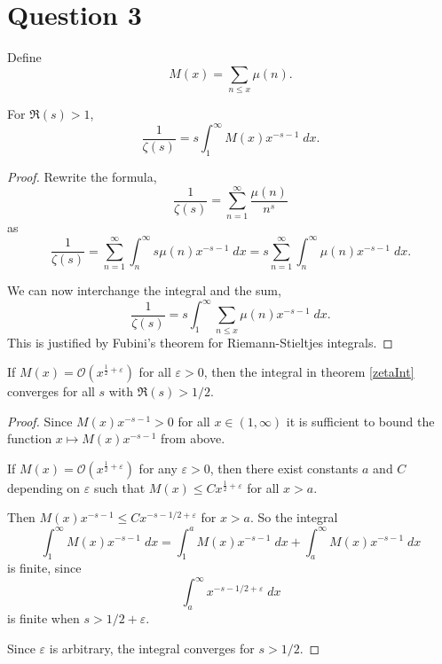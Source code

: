 \documentclass{unswmaths}
\begin{document}
\section*{Question 3}
Define
\begin{equation*}
    M(x) = \sum_{n\leq x} \mu(n).
\end{equation*}
\begin{theorem} 
\label{zetaInt}
    For $\Re(s) > 1$,
    \begin{equation*}
        \frac{1}{\zeta(s)} = s\int_{1}^\infty M(x)x^{-s-1}\;dx.
    \end{equation*}
\end{theorem}
\begin{proof}
    Rewrite the formula,
    \begin{equation*}
        \frac{1}{\zeta(s)} = \sum_{n=1}^\infty \frac{\mu(n)}{n^s}
    \end{equation*}
    as
    \begin{equation*}
        \frac{1}{\zeta(s)} = \sum_{n=1}^\infty \int_{n}^\infty s\mu(n)x^{-s-1}\;dx = s\sum_{n=1}^\infty \int_{n}^\infty \mu(n)x^{-s-1}\;dx.
    \end{equation*}
    
    We can now interchange the integral and the sum,
    \begin{equation*}
        \frac{1}{\zeta(s)} = s\int_{1}^\infty\sum_{n\leq x} \mu(n) x^{-s-1}\;dx.
    \end{equation*}
    This is justified by Fubini's theorem for Riemann-Stieltjes integrals.
\end{proof}
\begin{lemma}
    If $M(x) = \mathcal{O}(x^{\frac{1}{2}+\varepsilon})$ for all $\varepsilon > 0$, then
    the integral in theorem \ref{zetaInt} converges for all $s$ with $\Re(s) > 1/2$.
\end{lemma}
\begin{proof}
    Since $M(x)x^{-s-1} > 0$ for all $x \in (1,\infty)$ it is sufficient to bound the
    function $x\mapsto M(x)x^{-s-1}$ from above.
    
    If $M(x) = \mathcal{O}(x^{\frac{1}{2}+\varepsilon})$ for any $\varepsilon > 0$,
    then there exist constants $a$ and $C$ depending on $\varepsilon$
    such that $M(x) \leq Cx^{\frac{1}{2}+\varepsilon}$ for all $x > a$. 
   
    Then $M(x)x^{-s-1} \leq Cx^{-s-1/2+\varepsilon}$ for $x > a$. So the integral
    \begin{equation*}
        \int_{1}^\infty M(x)x^{-s-1}\;dx = \int_{1}^a M(x)x^{-s-1}\;dx+\int_{a}^\infty M(x)x^{-s-1}\;dx
    \end{equation*}    
    is finite, since
    \begin{equation*}
        \int_{a}^\infty x^{-s-1/2+\varepsilon}\;dx
    \end{equation*}
    is finite when $s > 1/2+\varepsilon$.
    
    Since $\varepsilon$ is arbitrary, the integral converges for $s > 1/2$.
\end{proof}
\end{document}
